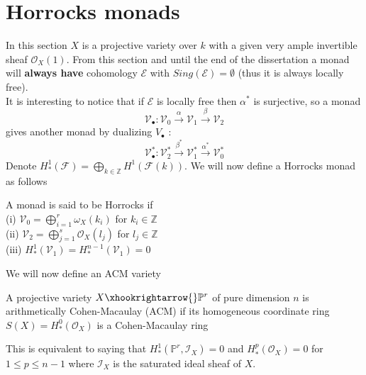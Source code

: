\documentclass[
	oldfontcommands,
	sumario=abnt-6027-2012,
	12pt,			%
	openright,		%
	oneside,		%
	a4paper,		%
	english,		%
	brazil			%
	]{imecc-unicamp}
\begin{document}
\section{Horrocks monads}
In this section $X$ is a projective variety over $k$ with a given very ample invertible sheaf $\mathcal{O}_X(1)$. From this section and until the end of the dissertation a monad will \textbf{always have} cohomology $\mathcal{E}$ with $Sing(\mathcal{E})=\emptyset$ (thus it is always locally free). \\
It is interesting to notice that if $\mathcal{E}$ is locally free then $\alpha^*$ is surjective, so a monad 
\begin{equation}
\mathcal{V}_\bullet : \mathcal{V}_0 \overset{ \alpha }{ \to} \mathcal{V}_1 \overset{ \beta }{ \to} \mathcal{V}_2
\end{equation}
gives another monad by dualizing $V_\bullet$ :
\begin{equation}
\mathcal{V}_\bullet ^* : \mathcal{V}_2 ^* \overset{ \beta ^* }{ \to} \mathcal{V}_1 ^* \overset{ \alpha ^* }{ \to} \mathcal{V}_0 ^*
\end{equation}
Denote $H^1_*(\mathcal{F})=\bigoplus_{k\in \mathbb{Z}}H^1(\mathcal{F}(k))$. We will now define a Horrocks monad as follows
\begin{definition}\label{horrocksdef1}\cite[Jardim \& Martins]{jardim2}
A monad is said to be Horrocks if \\
(i) $\mathcal{V}_0 = \bigoplus\limits_{i=1}^r \omega_X (k_i)$ for $k_i \in \mathbb{Z}$ \\
(ii) $\mathcal{V}_2 = \bigoplus\limits_{j=1}^s \mathcal{O}_X (l_j)$ for $l_j \in \mathbb{Z}$ \\
(iii) $H^1_{*}(\mathcal{V}_1)=H^{n-1}_{*}(\mathcal{V}_1)=0$ \\
\end{definition}
We will now define an ACM variety
\begin{definition}\label{ACM}\cite[Eisenbud]{eisenbud}
A projective variety $X \xhookrightarrow{} \mathbb{P}^r$ of pure dimension $n$ is arithmetically Cohen-Macaulay (ACM) if its homogeneous coordinate ring $S(X)=H^0_{*}(\mathcal{O}_X)$ is a Cohen-Macaulay ring
\end{definition}
This is equivalent to saying that $H^1_{*}(\mathbb{P}^r,\mathcal{I}_X)=0$ and $H^p_{*} (\mathcal{O}_X)=0$ for $1 \leq p \leq n-1$ where $\mathcal{I}_X$ is the saturated ideal sheaf of $X$.
\end{document}
